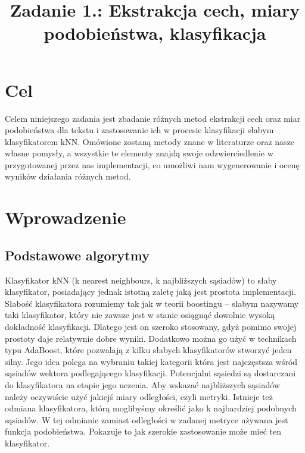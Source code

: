 \documentclass[a4paper]{classrep}
\author{%
  \studentinfo{Mateusz Grotek}{186816} \and
  \studentinfo{Paweł Tarasiuk}{186875}
}
\title{Zadanie 1.: Ekstrakcja cech, miary podobieństwa, klasyfikacja}
\begin{document}
\maketitle
\section{Cel}
Celem niniejszego zadania jest zbadanie różnych metod ekstrakcji cech
oraz miar podobieństwa dla tekstu i zastosowanie ich w procesie klasyfikacji słabym klasyfikatorem kNN.
Omówione zostaną metody znane w literaturze oraz nasze własne pomysły,
a wszystkie te elementy znajdą swoje odzwierciedlenie w przygotowanej
przez nas implementacji, co umożliwi nam wygenerowanie i ocenę wyników
działania różnych metod.
\section{Wprowadzenie}
\subsection{Podstawowe algorytmy}
Klasyfikator kNN (k nearest neighbours, k najbliższych sąsiadów) to słaby klasyfikator, posiadający jednak istotną zaletę jaką jest prostota implementacji. Słabość klasyfikatora rozumiemy tak jak w teorii boostingu -- słabym nazywamy taki klasyfikator, który nie zawsze jest w stanie osiągnąć dowolnie wysoką dokładność klasyfikacji.
Dlatego jest on szeroko stosowany, gdyż pomimo swojej prostoty daje relatywnie dobre wyniki. Dodatkowo można go użyć w technikach typu AdaBoost,
które pozwalają z kilku słabych klasyfikatorów stworzyć jeden silny. Jego idea polega na wybraniu takiej kategorii która jest najczęstsza wśród sąsiadów wektora podlegającego klasyfikacji.
Potencjalni sąsiedzi są dostarczani do klasyfikatora na etapie jego uczenia. Aby wskazać najbliższych sąsiadów należy oczywiście użyć jakiejś miary odległości, czyli metryki.
Istnieje też odmiana klasyfikatora, którą moglibyśmy określić jako k najbardziej podobnych sąsiadów. W tej odmianie zamiast odległości w zadanej metryce używana jest funkcja podobieństwa.
Pokazuje to jak szerokie zastosowanie może mieć ten klasyfikator.
\end{document}
